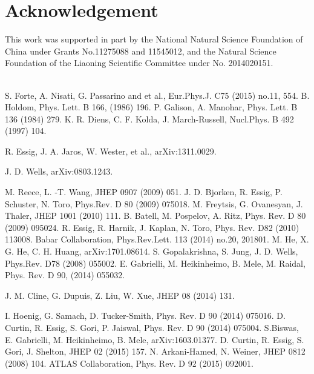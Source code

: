 \documentclass{article}
\begin{document}
	

\section*{Acknowledgement}

\noindent
This work was
supported in part by the National Natural Science Foundation of
China under Grants No.11275088 and 11545012, and  the Natural Science Foundation of the Liaoning Scientific Committee under
No. 2014020151.
\begin{thebibliography}\\



S. Forte,  A. Nisati, G. Passarino and et al., Eur.Phys.J. C75 (2015) no.11, 554.
B. Holdom, Phys. Lett. B 166, (1986) 196.
P. Galison, A. Manohar, Phys. Lett. B 136 (1984) 279.
K. R. Diens, C. F. Kolda, J. March-Russell, Nucl.Phys. B 492 (1997) 104.

R. Essig, J. A. Jaros, W. Wester, et al.,  arXiv:1311.0029.

J. D. Wells, arXiv:0803.1243.

M. Reece, L. -T. Wang, JHEP 0907 (2009) 051.
J. D. Bjorken, R. Essig, P. Schuster, N. Toro, Phys.Rev. D 80 (2009) 075018.
M. Freytsis, G. Ovanesyan, J. Thaler, JHEP 1001 (2010) 111.
B. Batell, M. Pospelov, A. Ritz, Phys. Rev. D 80 (2009) 095024.
R. Essig, R. Harnik, J. Kaplan,  N. Toro,  Phys. Rev. D82 (2010) 113008.
Babar Collaboration, Phys.Rev.Lett. 113 (2014) no.20, 201801.
M. He, X. G. He, C. H. Huang, arXiv:1701.08614.
S. Gopalakrishna, S. Jung, J. D. Wells, Phys.Rev. D78 (2008) 055002.
E. Gabrielli, M. Heikinheimo, B. Mele, M. Raidal, Phys. Rev. D 90, (2014) 055032.

J. M. Cline, G. Dupuis, Z. Liu,  W. Xue, JHEP 08 (2014) 131.

I. Hoenig, G. Samach, D. Tucker-Smith, Phys. Rev. D 90 (2014) 075016.
D. Curtin, R. Essig, S. Gori, P. Jaiswal, Phys. Rev. D 90 (2014) 075004.
S.Biswas, E. Gabrielli, M. Heikinheimo, B. Mele, arXiv:1603.01377.
D. Curtin, R. Essig, S. Gori, J. Shelton,  JHEP 02 (2015) 157.
N. Arkani-Hamed, N. Weiner, JHEP 0812 (2008) 104.
ATLAS Collaboration, Phys. Rev. D 92 (2015) 092001.


\end{thebibliography}
\end{document}
